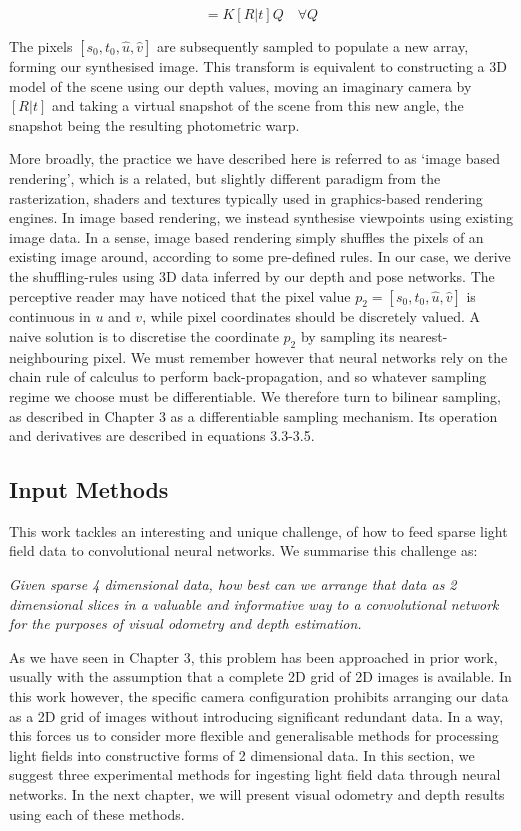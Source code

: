 \begin{equation}
    [s_0, t_0, \hat{u}, \hat{v}] = K[R|t]Q \quad \forall Q
\end{equation}

The pixels $[s_0, t_0, \hat{u}, \hat{v}]$ are subsequently sampled to populate a new array, forming our synthesised image. This transform is equivalent to constructing a 3D model of the scene using our depth values, moving an imaginary camera by $[R|t]$ and taking a virtual snapshot of the scene from this new angle, the snapshot being the resulting photometric warp.

More broadly, the practice we have described here is referred to as `image based rendering', which is a related, but slightly different paradigm from the rasterization, shaders and textures typically used in graphics-based rendering engines. In image based rendering, we instead synthesise viewpoints using existing image data. In a sense, image based rendering simply shuffles the pixels of an existing image around, according to some pre-defined rules. In our case, we derive the shuffling-rules using 3D data inferred by our depth and pose networks. The perceptive reader may have noticed that the pixel value $p_2 = [s_0, t_0, \hat{u}, \hat{v}]$ is continuous in $u$ and $v$, while pixel coordinates should be discretely valued. A naive solution is to discretise the coordinate $p_2$ by sampling its nearest-neighbouring pixel. We must remember however that neural networks rely on the chain rule of calculus to perform back-propagation, and so whatever sampling regime we choose must be differentiable. We therefore turn to bilinear sampling, as described in Chapter 3 as a differentiable sampling mechanism. Its operation and derivatives are described in equations 3.3-3.5.


\subsection{Input Methods}

This work tackles an interesting and unique challenge, of how to feed sparse light field data to convolutional neural networks. We summarise this challenge as:

\textit{Given sparse 4 dimensional data, how best can we arrange that data as 2 dimensional slices in a valuable and informative way to a convolutional network for the purposes of visual odometry and depth estimation.}

As we have seen in Chapter 3, this problem has been approached in prior work, usually with the assumption that a complete 2D grid of 2D images is available. In this work however, the specific camera configuration prohibits arranging our data as a 2D grid of images without introducing significant redundant data. In a way, this forces us to consider more flexible and generalisable methods for processing light fields into constructive forms of 2 dimensional data. In this section, we suggest three experimental methods for ingesting light field data through neural networks. In the next chapter, we will present visual odometry and depth results using each of these methods.

